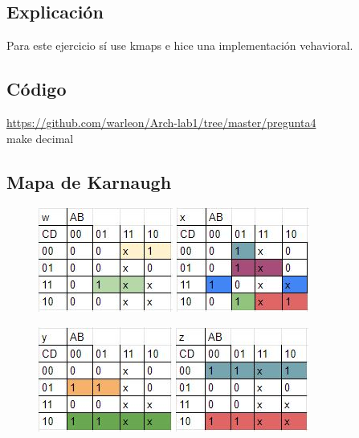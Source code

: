 \subsection*{Explicación}
Para este ejercicio sí use kmaps e hice una implementación vehavioral.
\subsection*{Código}
\faGithub \space
\href{https://github.com/warleon/Arch-lab1/tree/master/pregunta4}{https://github.com/warleon/Arch-lab1/tree/master/pregunta4}\\
make decimal


\subsection*{Mapa de Karnaugh}
\begin{figure}[h]
    \centering

    \includegraphics{fotos/kmaps/kmap1-lab1-arqui.JPG}
    \includegraphics{fotos/kmaps/kmap2-lab1-arqui.JPG}

   
    \includegraphics{fotos/kmaps/kmap3-lab1-arqui.JPG}
    \includegraphics{fotos/kmaps/kmap4-lab1-arqui.JPG}
\end{figure}

